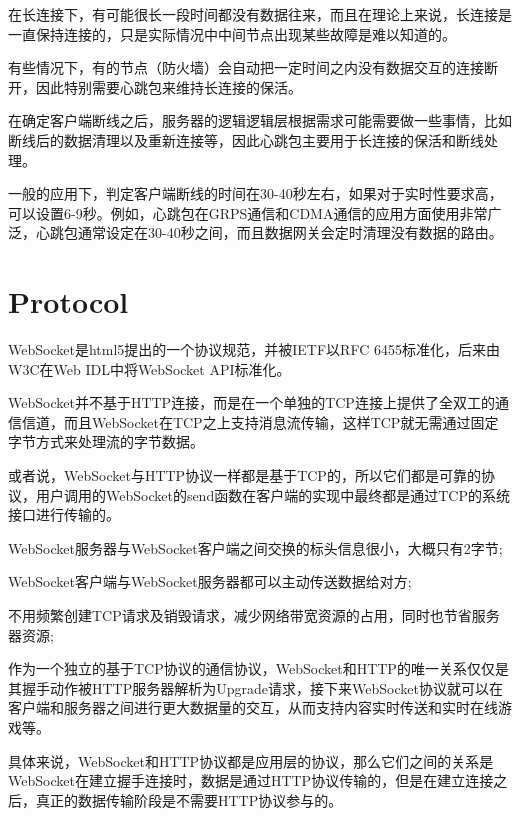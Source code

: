 在长连接下，有可能很长一段时间都没有数据往来，而且在理论上来说，长连接是一直保持连接的，只是实际情况中中间节点出现某些故障是难以知道的。

有些情况下，有的节点（防火墙）会自动把一定时间之内没有数据交互的连接断开，因此特别需要心跳包来维持长连接的保活。

在确定客户端断线之后，服务器的逻辑逻辑层根据需求可能需要做一些事情，比如断线后的数据清理以及重新连接等，因此心跳包主要用于长连接的保活和断线处理。

一般的应用下，判定客户端断线的时间在30-40秒左右，如果对于实时性要求高，可以设置6-9秒。例如，心跳包在GRPS通信和CDMA通信的应用方面使用非常广泛，心跳包通常设定在30-40秒之间，而且数据网关会定时清理没有数据的路由。

\section{Protocol}

WebSocket是html5提出的一个协议规范，并被IETF以RFC 6455标准化，后来由W3C在Web IDL中将WebSocket API标准化。

WebSocket并不基于HTTP连接，而是在一个单独的TCP连接上提供了全双工的通信信道，而且WebSocket在TCP之上支持消息流传输，这样TCP就无需通过固定字节方式来处理流的字节数据。

或者说，WebSocket与HTTP协议一样都是基于TCP的，所以它们都是可靠的协议，用户调用的WebSocket的send函数在客户端的实现中最终都是通过TCP的系统接口进行传输的。

\begin{compactitem}
\item WebSocket服务器与WebSocket客户端之间交换的标头信息很小，大概只有2字节;
\item WebSocket客户端与WebSocket服务器都可以主动传送数据给对方;
\item 不用频繁创建TCP请求及销毁请求，减少网络带宽资源的占用，同时也节省服务器资源;
\end{compactitem}

作为一个独立的基于TCP协议的通信协议，WebSocket和HTTP的唯一关系仅仅是其握手动作被HTTP服务器解析为Upgrade请求，接下来WebSocket协议就可以在客户端和服务器之间进行更大数据量的交互，从而支持内容实时传送和实时在线游戏等。


具体来说，WebSocket和HTTP协议都是应用层的协议，那么它们之间的关系是WebSocket在建立握手连接时，数据是通过HTTP协议传输的，但是在建立连接之后，真正的数据传输阶段是不需要HTTP协议参与的。

